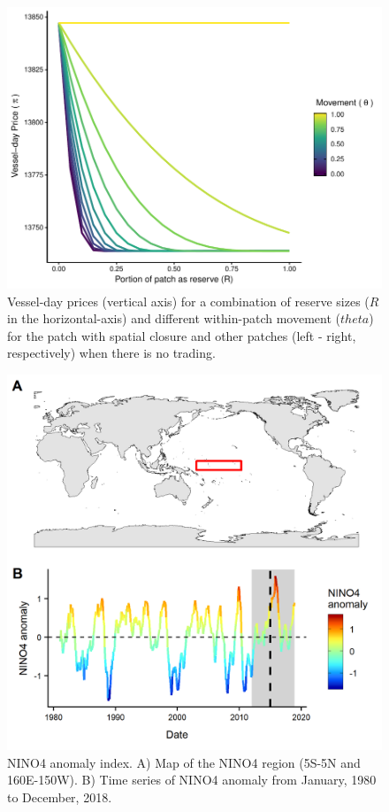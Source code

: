 \documentclass[12pt]{article}
\begin{document}
\begin{figure}
\centering
\includegraphics{img/vessel_day_price_with_trading_plot.pdf}
\caption{\label{fig:vessel_day_price_with_trading_plot}Vessel-day prices (vertical axis) for a combination of reserve sizes ($R$ in the horizontal-axis) and different within-patch movement ($theta$) for the patch with spatial closure and other patches (left - right, respectively) when there is no trading.}
\end{figure}

\begin{figure}
\centering
\includegraphics{img/nino_plot.png}
\caption{\label{fig:nino_plot}NINO4 anomaly index. A) Map of the NINO4 region (5S-5N and 160E-150W). B) Time series of NINO4 anomaly from January, 1980 to December, 2018.}
\end{figure}
\end{document}
